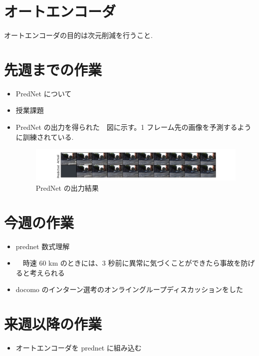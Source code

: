 \section{オートエンコーダ}
オートエンコーダの目的は次元削減を行うこと.
\section{先週までの作業}
\begin{itemize}
          \item PredNet について
          \item 授業課題
          \item PredNet の出力を得られた　図に示す。1 フレーム先の画像を予測するように訓練されている.
\begin{figure}[hb]
\begin{center}
\includegraphics[scale=0.8]{plot_1.png}
\caption{PredNet の出力結果}
\end{center}
\end{figure}

\end{itemize}

\section{今週の作業}
\begin{itemize}       
         \item prednet 数式理解
         \item　時速 60 km のときには、3 秒前に異常に気づくことができたら事故を防げると考えられる
         \item docomo のインターン選考のオンライングループディスカッションをした
\end{itemize}

\section{来週以降の作業}
\begin{itemize}
         \item オートエンコーダを prednet に組み込む
\end{itemize}





